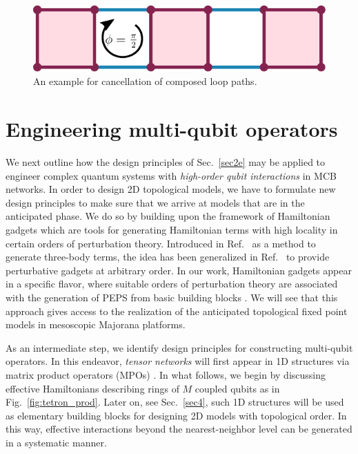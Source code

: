 \documentclass[twocolumn,floats,prx,showpacs]{revtex4-1}
\newcommand{\rein}[1]{{\color{rein} #1}}
\begin{document}
\begin{figure}
\includegraphics[width=0.72 \columnwidth]{fig/compose.pdf}
\caption{An example for cancellation of composed loop paths.}
\label{fig:compose}
\end{figure}

\section{Engineering multi-qubit operators}\label{sec3}

We next outline  how the  design principles of Sec.~\ref{sec2e} may be applied to engineer complex quantum systems with \emph{high-order qubit interactions} in MCB networks. 
In order to design 2D topological models, we have to formulate new
design principles to make sure that we arrive at models that are in the anticipated phase. We do so by building upon the 
framework of Hamiltonian gadgets 
\cite{Kempe-SIAM-2006,PhysRevA.77.062329,Brell2014PEPS,Bartlett06} \rein{which
are tools for generating Hamiltonian terms with high locality in certain orders of perturbation theory. Introduced
in Ref.~\cite{Kempe-SIAM-2006} as a method to generate three-body terms, the idea has been generalized in 
Ref.~\cite{PhysRevA.77.062329} to provide perturbative gadgets at arbitrary order. In our work, Hamiltonian gadgets appear in a 
specific flavor, where suitable orders of perturbation theory are associated with the  generation of PEPS from basic building blocks
\cite{Brell2014PEPS,Bartlett06}. We will see that this approach gives access to the realization of
the anticipated topological fixed point models in mesoscopic Majorana platforms.}

As an intermediate step, we identify design principles for constructing multi-qubit operators. \rein{In this endeavor, \emph{tensor networks} \cite{Orus-AnnPhys-2014,AreaReview,VerstraeteBig,SchuchReview}
will first appear in 1D structures via matrix product operators (MPOs)
\cite{Mixed,1367-2630-12-2-025012,raey,MPO_Representations,UndecidableMPO,Bultinck2017}.
In what follows, we begin by discussing effective Hamiltonians describing  rings of $M$ coupled qubits as in Fig.~\ref{fig:tetron_prod}.  Later on, see Sec.~\ref{sec4}, such 1D structures will be used as elementary building blocks for designing 2D models with topological order. In this way,  effective interactions beyond the nearest-neighbor level can be generated in a systematic manner.  }
\end{document}
